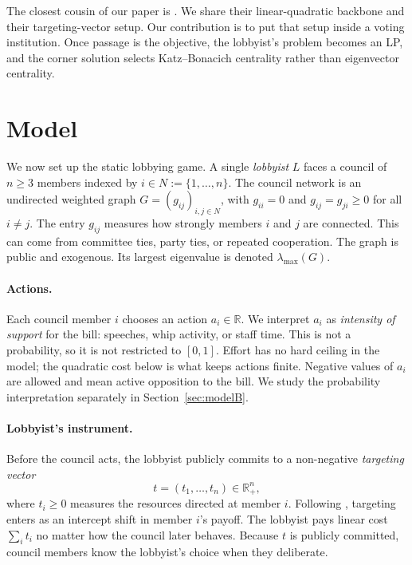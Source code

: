 \documentclass[11pt,letterpaper]{article}
\theoremstyle{plain}
\theoremstyle{definition}
\theoremstyle{remark}
\begin{document}
The closest cousin of our paper is \citet{ggg2020}. We share their linear-quadratic backbone and their targeting-vector setup. Our contribution is to put that setup inside a voting institution. Once passage is the objective, the lobbyist's problem becomes an LP, and the corner solution selects Katz--Bonacich centrality rather than eigenvector centrality.


\section{Model}
\label{sec:model}

We now set up the static lobbying game. A single \emph{lobbyist} $L$ faces a council of $n \geq 3$ members indexed by $i \in N := \{1, \ldots, n\}$. The council network is an undirected weighted graph $G = (g_{ij})_{i,j \in N}$, with $g_{ii} = 0$ and $g_{ij} = g_{ji} \geq 0$ for all $i \neq j$. The entry $g_{ij}$ measures how strongly members $i$ and $j$ are connected. This can come from committee ties, party ties, or repeated cooperation. The graph is public and exogenous. Its largest eigenvalue is denoted $\lambda_{\max}(G)$.

\paragraph{Actions.} Each council member $i$ chooses an action $a_i \in \mathbb{R}$. We interpret $a_i$ as \emph{intensity of support} for the bill: speeches, whip activity, or staff time. This is not a probability, so it is not restricted to $[0,1]$. Effort has no hard ceiling in the model; the quadratic cost below is what keeps actions finite. Negative values of $a_i$ are allowed and mean active opposition to the bill. We study the probability interpretation separately in Section~\ref{sec:modelB}.

\paragraph{Lobbyist's instrument.} Before the council acts, the lobbyist publicly commits to a non-negative \emph{targeting vector}
\[
t = (t_1, \ldots, t_n) \in \mathbb{R}^n_+,
\]
where $t_i \geq 0$ measures the resources directed at member $i$. Following \citet{ggg2020}, targeting enters as an intercept shift in member $i$'s payoff. The lobbyist pays linear cost $\sum_i t_i$ no matter how the council later behaves. Because $t$ is publicly committed, council members know the lobbyist's choice when they deliberate.
\end{document}
